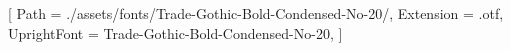 

[
    Path = ./assets/fonts/Trade-Gothic-Bold-Condensed-No-20/,
    Extension = .otf,
    UprightFont = Trade-Gothic-Bold-Condensed-No-20,
]
